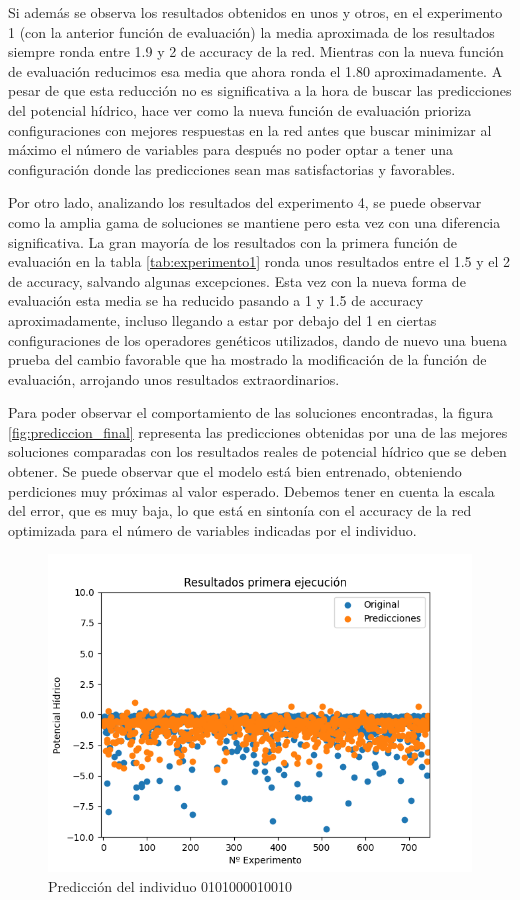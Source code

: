 Si además se observa los resultados obtenidos en unos y otros, en el experimento 1 (con la anterior función de evaluación) la media aproximada de los resultados siempre ronda entre 1.9 y 2 de accuracy de la red. Mientras con la nueva función de evaluación reducimos esa media que ahora ronda el 1.80 aproximadamente. A pesar de que esta reducción no es significativa a la hora de buscar las predicciones del potencial hídrico, hace ver como la nueva función de evaluación prioriza configuraciones con mejores respuestas en la red antes que buscar minimizar al máximo el número de variables para después no poder optar a tener una configuración donde las predicciones sean mas satisfactorias y favorables.

Por otro lado, analizando los resultados del experimento 4, se puede observar como la amplia gama de soluciones se mantiene pero esta vez con una diferencia significativa. La gran mayoría de los resultados con la primera función de evaluación en la tabla \ref{tab:experimento1} ronda unos resultados entre el 1.5 y el 2 de accuracy, salvando algunas excepciones. Esta vez con la nueva forma de evaluación esta media se ha reducido pasando a 1 y 1.5 de accuracy aproximadamente, incluso llegando a estar por debajo del 1 en ciertas configuraciones de los operadores genéticos utilizados, dando de nuevo una buena prueba del cambio favorable que ha mostrado la modificación de la función de evaluación, arrojando unos resultados extraordinarios.

\newpage
Para poder observar el comportamiento de las soluciones encontradas, la figura \ref{fig:prediccion_final} representa las predicciones obtenidas por una de las mejores soluciones comparadas con los resultados reales de potencial hídrico que se deben obtener. Se puede observar que el modelo está bien entrenado, obteniendo perdiciones muy próximas al valor esperado. Debemos tener en cuenta la escala del error, que es muy baja, lo que está en sintonía con el accuracy de la red optimizada para el número de variables indicadas por el individuo.

\begin{figure}[h!]
\centering
 \includegraphics[width=.8\linewidth]{images/Prediccion.png}
\caption{Predicción del individuo 0101000010010}
\label{fig:westminster_aerea}
\end{figure}


